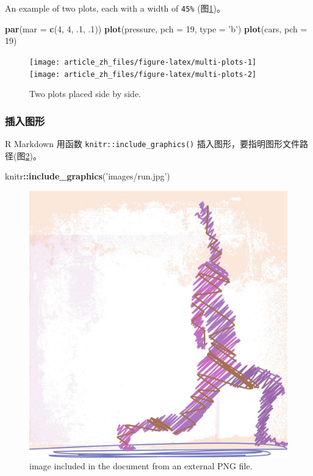 \documentclass[]{article}
\newenvironment{Shaded}{\begin{snugshade}}{\end{snugshade}}
\newcommand{\DataTypeTok}[1]{\textcolor[rgb]{0.13,0.29,0.53}{#1}}
\newcommand{\DecValTok}[1]{\textcolor[rgb]{0.00,0.00,0.81}{#1}}
\newcommand{\FloatTok}[1]{\textcolor[rgb]{0.00,0.00,0.81}{#1}}
\newcommand{\KeywordTok}[1]{\textcolor[rgb]{0.13,0.29,0.53}{\textbf{#1}}}
\newcommand{\NormalTok}[1]{#1}
\newcommand{\OperatorTok}[1]{\textcolor[rgb]{0.81,0.36,0.00}{\textbf{#1}}}
\newcommand{\StringTok}[1]{\textcolor[rgb]{0.31,0.60,0.02}{#1}}
\begin{document}
An example of two plots, each with a width of \texttt{45\%}
(图\ref{fig:multi-plots})。

\begin{Shaded}
\begin{Highlighting}[]
\KeywordTok{par}\NormalTok{(}\DataTypeTok{mar =} \KeywordTok{c}\NormalTok{(}\DecValTok{4}\NormalTok{, }\DecValTok{4}\NormalTok{, }\FloatTok{.1}\NormalTok{, }\FloatTok{.1}\NormalTok{))}
\KeywordTok{plot}\NormalTok{(pressure, }\DataTypeTok{pch =} \DecValTok{19}\NormalTok{, }\DataTypeTok{type =} \StringTok{'b'}\NormalTok{)}
\KeywordTok{plot}\NormalTok{(cars, }\DataTypeTok{pch =} \DecValTok{19}\NormalTok{)}
\end{Highlighting}
\end{Shaded}

\begin{figure}

{\centering \texttt{[image: article\_zh\_files/figure-latex/multi-plots-1]} \texttt{[image: article\_zh\_files/figure-latex/multi-plots-2]} 

}

\caption{Two plots placed side by side.}\label{fig:multi-plots}
\end{figure}

\subsubsection{插入图形}

R Markdown 用函数 \texttt{knitr::include\_graphics()}
插入图形，要指明图形文件路径(图\ref{fig:run})。

\begin{Shaded}
\begin{Highlighting}[]
\NormalTok{knitr}\OperatorTok{::}\KeywordTok{include_graphics}\NormalTok{(}\StringTok{'images/run.jpg'}\NormalTok{)}
\end{Highlighting}
\end{Shaded}

\begin{figure}

{\centering \includegraphics[width=0.5\linewidth]{images/run} 

}

\caption{image included in the document from an external PNG file.}\label{fig:run}
\end{figure}
\end{document}
